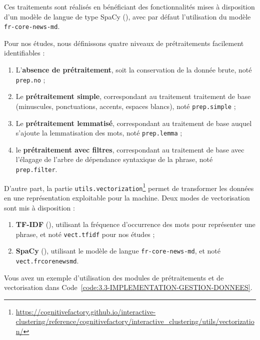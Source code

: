 		Ces traitements sont réalisés en bénéficiant des fonctionnalités mises à disposition d'un modèle de langue de type SpaCy (\cite{honnibal-montani:2017:spacy-natural-language}), avec par défaut l'utilisation du modèle \texttt{fr-core-news-md}.
		
		Pour nos études, nous définissons quatre niveaux de prétraitements facilement identifiables :
		\begin{enumerate}
			\item L'\textbf{absence de prétraitement}, soit la conservation de la donnée brute, noté \texttt{prep.no} ;
			\item Le \textbf{prétraitement simple}, correspondant au traitement traitement de base (minuscules, ponctuations, accents, espaces blancs), noté \texttt{prep.simple} ; 
			\item Le \textbf{prétraitement lemmatisé}, correspondant au traitement de base auquel s'ajoute la lemmatisation des mots, noté \texttt{prep.lemma} ;
			\item le \textbf{prétraitement avec filtres}, correspondant au traitement de base avec l'élagage de l'arbre de dépendance syntaxique de la phrase, noté \texttt{prep.filter}.
		\end{enumerate}
		
		
		D'autre part, la partie \texttt{utils.vectorization}\footnote{\url{https://cognitivefactory.github.io/interactive-clustering/reference/cognitivefactory/interactive_clustering/utils/vectorization/}} permet de transformer les données en une représentation exploitable pour la machine.
		Deux modes de vectorisation sont mis à disposition :
		\begin{enumerate}
			\item \textbf{TF-IDF} (\cite{sparck-jones:1972:statistical-interpretation-term}), utilisant la fréquence d'occurrence des mots pour représenter une phrase, et noté \texttt{vect.tfidf} pour nos études ;
			\item \textbf{SpaCy} (\cite{honnibal-montani:2017:spacy-natural-language}), utilisant le modèle de langue \texttt{fr-core-news-md}, et noté \texttt{vect.frcorenewsmd}.
		\end{enumerate}
		
		Vous avez un exemple d'utilisation des modules de prétraitements et de vectorisation dans Code~\ref{code:3.3-IMPLEMENTATION-GESTION-DONNEES}.
		
